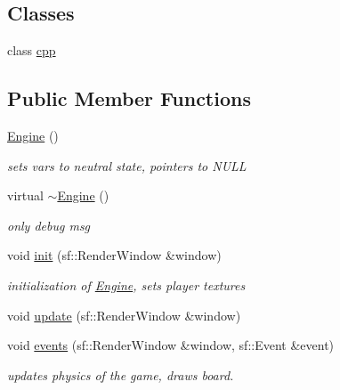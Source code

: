 \subsection*{Classes}
\begin{DoxyCompactItemize}
\item 
class \hyperlink{class_engine_1_1cpp}{cpp}
\end{DoxyCompactItemize}
\subsection*{Public Member Functions}
\begin{DoxyCompactItemize}
\item 
\hyperlink{class_engine_a8c98683b0a3aa28d8ab72a8bcd0d52f2}{Engine} ()
\begin{DoxyCompactList}\small\item\em sets vars to neutral state, pointers to N\+U\+L\+L \end{DoxyCompactList}\item 
virtual \hyperlink{class_engine_a8ef7030a089ecb30bbfcb9e43094717a}{$\sim$\+Engine} ()
\begin{DoxyCompactList}\small\item\em only debug msg \end{DoxyCompactList}\item 
void \hyperlink{class_engine_af4a62564ef402b7b5a8d880f05d5b120}{init} (sf\+::\+Render\+Window \&window)
\begin{DoxyCompactList}\small\item\em initialization of \hyperlink{class_engine}{Engine}, sets player textures \end{DoxyCompactList}\item 
void \hyperlink{class_engine_aaa07c6646868b4f752fbb91c3ec5380c}{update} (sf\+::\+Render\+Window \&window)
\item 
void \hyperlink{class_engine_a5c3c086eeec69ae6780eb0ffb5a9848e}{events} (sf\+::\+Render\+Window \&window, sf\+::\+Event \&event)
\begin{DoxyCompactList}\small\item\em updates physics of the game, draws board. \end{DoxyCompactList}\end{DoxyCompactItemize}
